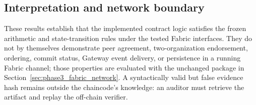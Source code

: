 \subsection{Interpretation and network boundary}
\label{sec:phase3_chaincode_boundary}

These results establish that the implemented contract logic satisfies the frozen arithmetic and state-transition rules under
the tested Fabric interfaces. They do not by themselves demonstrate peer agreement, two-organization endorsement, ordering,
commit status, Gateway event delivery, or persistence in a running Fabric channel; those properties are evaluated with the
unchanged package in Section~\ref{sec:phase3_fabric_network}. A syntactically valid but false evidence hash remains outside the
chaincode's knowledge: an auditor must retrieve the artifact and replay the off-chain verifier.
